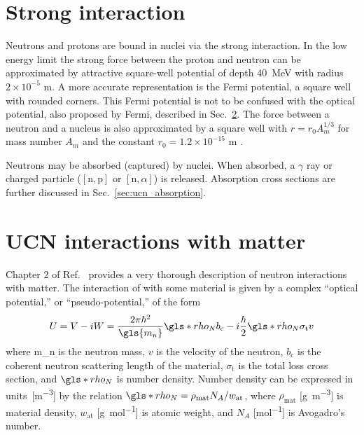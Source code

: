 
\section{Strong interaction}


Neutrons and protons are bound in nuclei via the strong interaction. In the low energy limit the strong force between the proton and neutron can be approximated by attractive square-well potential of depth \qty{40}{\mega\eV} with radius $2\times10^{-5}\text{ m}$. A more accurate representation is the Fermi potential, a square well with rounded corners. This Fermi potential is not to be confused with the optical potential, also proposed by Fermi, described in Sec.~\ref{sec:ucn_matter_int}. The force between a neutron and a nucleus is also approximated by a square well with $r=r_0A_m^{1/3}$ for mass number $A_m$ and the constant $r_0=1.2\times10^{-15}\text{ m}$ \cite{golubUCN}.

Neutrons may be absorbed (captured) by nuclei. When absorbed, a $\gamma$ ray or charged particle ($[\text{n},\text{p}]$ or $[\text{n},\alpha]$) is released. Absorption cross sections are further discussed in Sec.~\ref{sec:ucn_absorption}.


\section{UCN interactions with matter}\label{sec:ucn_matter_int}


Chapter 2 of Ref.~\cite{golubUCN} provides a very thorough description of neutron interactions with matter. The interaction of \ucn with some material is given by a complex ``optical potential,'' or ``pseudo-potential,'' of the form
%
\begin{gather}
    U = V - iW = \frac{2\pi\hbar^2}{\gls{m_n}}\gls*{rho_N} b_\text{c}-i\frac{\hbar}{2}\gls*{rho_N} \sigma_{\text{t}} v \label{eq:optical_potential}
\end{gather}
%
where \gls{m_n} is the neutron mass, $v$ is the velocity of the neutron, $b_\text{c}$ is the coherent neutron scattering length of the material, $\sigma_{\text{t}}$ is the total loss cross section, and $\gls*{rho_N}$ is number density. Number density can be expressed in units~[\unit{\meter^{-3}}] by the relation $\gls*{rho_N}=\rho_\text{mat}N_A/w_\text{at}$, where $\rho_\text{mat}$ [\unit{\g\per\m^3}] is material density, $w_\text{at}$ [\unit{\g\per\mole}] is atomic weight, and $N_A$ [\unit{\mole^{-1}}] is Avogadro's number. 

